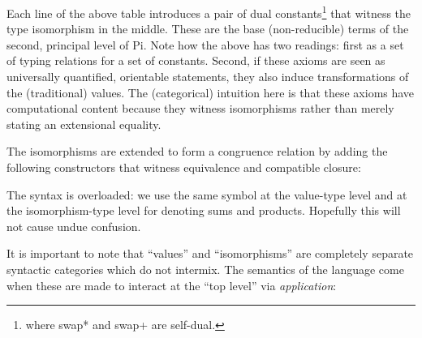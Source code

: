 \documentclass{llncs}
\newcommand{\roshan}[1]{}
\begin{document}
\noindent Each line of the above table introduces a pair of dual
constants\footnote{where {{swap*}} and {{swap+}} are self-dual.} that witness
the type isomorphism in the middle.  These are the base (non-reducible) terms
of the second, principal level of {{Pi}}. Note how the above has two
readings: first as a set of typing relations for a set of constants. Second,
if these axioms are seen as universally quantified, orientable statements,
they also induce transformations of the (traditional) values. The
(categorical) intuition here is that these axioms have computational content
because they witness isomorphisms rather than merely stating an extensional
equality.

The isomorphisms are extended to form a congruence relation by adding the
following constructors that witness equivalence and compatible closure:

%
%
%
\noindent The syntax is overloaded: we use the same symbol at the value-type level
and at the isomorphism-type level for denoting sums and products.  Hopefully
this will not cause undue confusion.

It is important to note that ``values'' and ``isomorphisms'' are completely
separate syntactic categories which do not intermix. The semantics of the
language come when these are made to interact at the ``top level'' via
\emph{application}: \roshan{I understand its intent, but this last sentence is unclear.}


\end{document}
